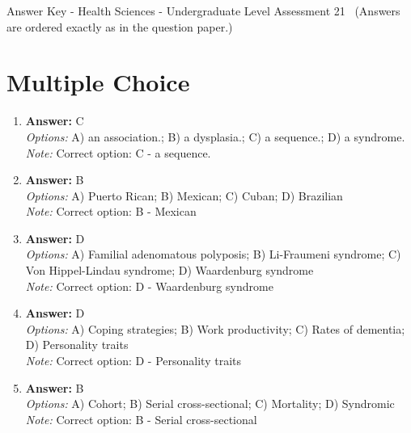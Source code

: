 \documentclass[12pt]{article}
\begin{document}
\begin{center}
Answer Key - Health Sciences - Undergraduate Level Assessment 21 \
\small (Answers are ordered exactly as in the question paper.)
\end{center}

\section*{Multiple Choice}
\begin{enumerate}[label=\arabic*.]
\item \textbf{Answer:} C
\\ \textit{Options:} A) an association.; B) a dysplasia.; C) a sequence.; D) a syndrome.
\\ \textit{Note:} Correct option: C - a sequence.
\item \textbf{Answer:} B
\\ \textit{Options:} A) Puerto Rican; B) Mexican; C) Cuban; D) Brazilian
\\ \textit{Note:} Correct option: B - Mexican
\item \textbf{Answer:} D
\\ \textit{Options:} A) Familial adenomatous polyposis; B) Li-Fraumeni syndrome; C) Von Hippel-Lindau syndrome; D) Waardenburg syndrome
\\ \textit{Note:} Correct option: D - Waardenburg syndrome
\item \textbf{Answer:} D
\\ \textit{Options:} A) Coping strategies; B) Work productivity; C) Rates of dementia; D) Personality traits
\\ \textit{Note:} Correct option: D - Personality traits
\item \textbf{Answer:} B
\\ \textit{Options:} A) Cohort; B) Serial cross-sectional; C) Mortality; D) Syndromic
\\ \textit{Note:} Correct option: B - Serial cross-sectional
\end{enumerate}
\end{document}
